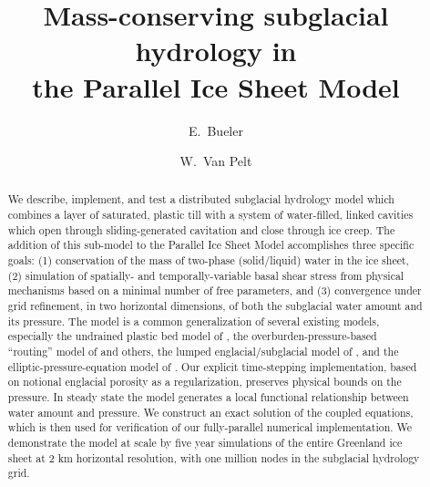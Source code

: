 \documentclass[gmd]{copernicus}   %
\begin{document}
\graphicspath{{figs/}}

\linenumbers

\title{Mass-conserving subglacial hydrology in \\ the Parallel Ice Sheet Model}


\author[1]{E.~Bueler}
\author[2]{W.~Van Pelt}





\received{}
\pubdiscuss{} %
\revised{}
\accepted{}
\published{}


\maketitle

\begin{abstract}
We describe, implement, and test a distributed subglacial hydrology model which combines a layer of saturated, plastic till with a system of water-filled, linked cavities which open through sliding-generated cavitation  and close through ice creep.  The addition of this sub-model to the Parallel Ice Sheet Model accomplishes three specific goals: (1) conservation of the mass of two-phase (solid/liquid) water in the ice sheet, (2) simulation of spatially- and temporally-variable basal shear stress from physical mechanisms based on a minimal number of free parameters, and (3) convergence under grid refinement, in two horizontal dimensions, of both the subglacial water amount and its pressure.  The model is a common generalization of several existing models, especially the undrained plastic bed model of \cite{Tulaczyketal2000b}, the overburden-pressure-based ``routing'' model of \cite{LeBrocqetal2009,Livingstoneetal2013} and others, the lumped englacial/subglacial model of \citep{Bartholomausetal2011}, and the elliptic-pressure-equation model of \cite{Schoofetal2012}.  Our explicit time-stepping implementation, based on notional englacial porosity as a regularization, preserves physical bounds on the pressure.  In steady state the model generates a local functional relationship between water amount and pressure.  We construct an exact solution of the coupled equations, which is then used for verification of our fully-parallel numerical implementation.  We demonstrate the model at scale by five year simulations of the entire Greenland ice sheet at 2 km horizontal resolution, with one million nodes in the subglacial hydrology grid.
\end{abstract}
\end{document}
